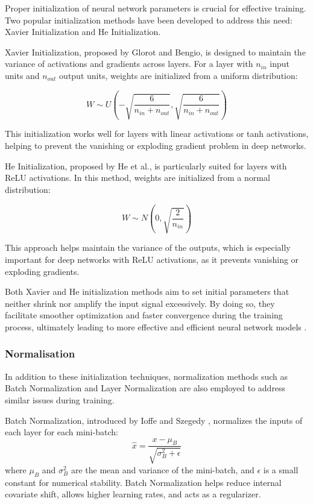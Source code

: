\documentclass[a4paper, oneside]{discothesis}
\begin{document}
Proper initialization of neural network parameters is crucial for effective training. Two popular initialization methods have been developed to address this need: Xavier Initialization and He Initialization.

Xavier Initialization, proposed by Glorot and Bengio, is designed to maintain the variance of activations and gradients across layers. For a layer with $n_{in}$ input units and $n_{out}$ output units, weights are initialized from a uniform distribution:

\begin{equation}
    W \sim U\left(-\sqrt{\frac{6}{n_{in} + n_{out}}}, \sqrt{\frac{6}{n_{in} + n_{out}}}\right)
\end{equation}

This initialization works well for layers with linear activations or tanh activations, helping to prevent the vanishing or exploding gradient problem in deep networks.

He Initialization, proposed by He et al., is particularly suited for layers with ReLU activations. In this method, weights are initialized from a normal distribution:

\begin{equation}
    W \sim N\left(0, \sqrt{\frac{2}{n_{in}}}\right)
\end{equation}

This approach helps maintain the variance of the outputs, which is especially important for deep networks with ReLU activations, as it prevents vanishing or exploding gradients.

Both Xavier and He initialization methods aim to set initial parameters that neither shrink nor amplify the input signal excessively. By doing so, they facilitate smoother optimization and faster convergence during the training process, ultimately leading to more effective and efficient neural network models \cite{glorot2010understanding, he2015delving}.

\subsubsection{Normalisation}

In addition to these initialization techniques, normalization methods such as Batch Normalization and Layer Normalization are also employed to address similar issues during training.

Batch Normalization, introduced by Ioffe and Szegedy \cite{ioffe2015batch}, normalizes the inputs of each layer for each mini-batch:
\begin{equation}
    \hat{x} = \frac{x - \mu_B}{\sqrt{\sigma_B^2 + \epsilon}}
\end{equation}
where $\mu_B$ and $\sigma_B^2$ are the mean and variance of the mini-batch, and $\epsilon$ is a small constant for numerical stability. Batch Normalization helps reduce internal covariate shift, allows higher learning rates, and acts as a regularizer.
\end{document}
